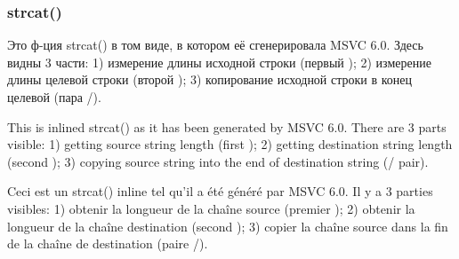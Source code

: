\subsubsection{strcat()}

\ifdefined\RUSSIAN
Это ф-ция strcat() в том виде, в котором её сгенерировала MSVC 6.0.
Здесь видны 3 части:
1) измерение длины исходной строки (первый );
2) измерение длины целевой строки (второй );
3) копирование исходной строки в конец целевой (пара /).
\fi %

\ifdefined\ENGLISH
This is inlined strcat() as it has been generated by MSVC 6.0.
There are 3 parts visible:
1) getting source string length (first );
2) getting destination string length (second );
3) copying source string into the end of destination string (/ pair).
\fi %

\ifdefined\FRENCH
Ceci est un strcat() inline tel qu'il a été généré par MSVC 6.0.
Il y a 3 parties visibles:
1) obtenir la longueur de la chaîne source (premier );
2) obtenir la longueur de la chaîne destination (second );
3) copier la chaîne source dans la fin de la chaîne de destination (paire /).
\fi %



